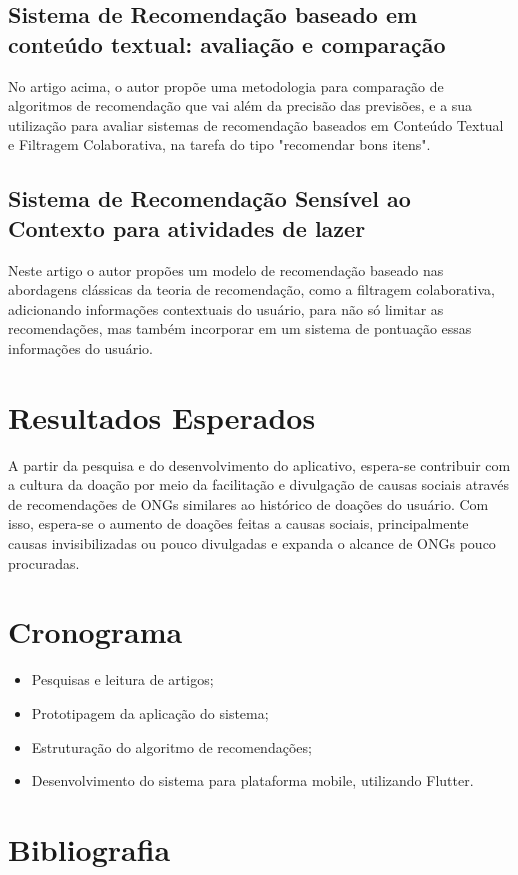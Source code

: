 \documentclass[conference]{IEEEtran}
\begin{document}
\subsection{Sistema de Recomendação baseado em conteúdo textual: avaliação e comparação}
No artigo acima, o autor propõe uma metodologia para comparação de
algoritmos de recomendação que vai além da precisão das previsões, e
a sua utilização para avaliar sistemas de recomendação baseados em
Conteúdo Textual e Filtragem Colaborativa, na tarefa do tipo
"recomendar bons itens". \cite{silva2017sistema}

\subsection{Sistema de Recomendação Sensível ao Contexto para atividades de lazer}
Neste artigo o autor propões um modelo de recomendação baseado nas abordagens clássicas da teoria de recomendação, como a filtragem colaborativa, adicionando informações contextuais do usuário, para não só limitar as recomendações, mas também incorporar em um sistema de pontuação essas informações do usuário. \cite{avancini2016sistema}


\section{Resultados Esperados}
A partir da pesquisa e do desenvolvimento do aplicativo, espera-se contribuir com a cultura da doação por meio da facilitação e divulgação de causas sociais através de recomendações de ONGs similares ao histórico de doações do usuário. Com isso, espera-se o aumento de doações feitas a causas sociais, principalmente causas invisibilizadas ou pouco divulgadas e expanda o alcance de ONGs pouco procuradas.



\section{Cronograma}
\begin{itemize}
\item Pesquisas e leitura de artigos;
\item Prototipagem da aplicação do sistema;
\item Estruturação do algoritmo de recomendações;
\item Desenvolvimento do sistema para plataforma mobile, utilizando Flutter.
\end{itemize}


\section{Bibliografia}


\end{document}
